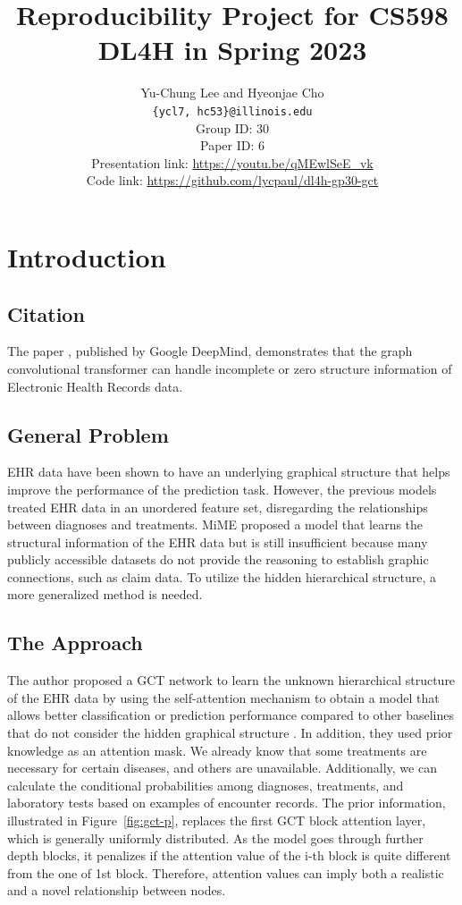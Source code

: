\documentclass[11pt,a4paper]{article}
\title{Reproducibility Project for CS598 DL4H in Spring 2023}
\author{Yu-Chung Lee and Hyeonjae Cho \\
  \texttt{\{ycl7, hc53\}@illinois.edu}
  \\[2em]
  Group ID: 30\\
  Paper ID: 6\\
  Presentation link: \url{https://youtu.be/qMEwlSeE_vk} \\
  Code link: \url{https://github.com/lycpaul/dl4h-gp30-gct}
  }
\begin{document}
\maketitle


\section{Introduction}
\subsection{Citation}
The paper \citep{DBLP:conf/aaai/ChoiXLDFXD20}, published by Google DeepMind, demonstrates that the graph convolutional transformer can handle incomplete or zero structure information of Electronic Health Records data.

\subsection{General Problem}
EHR data have been shown to have an underlying graphical structure that helps improve the performance of the prediction task. However, the previous models treated EHR data in an unordered feature set, disregarding the relationships between diagnoses and treatments. MiME \citep{DBLP:conf/nips/ChoiXSS18} proposed a model that learns the structural information of the EHR data but is still insufficient because many publicly accessible datasets do not provide the reasoning to establish graphic connections, such as claim data. To utilize the hidden hierarchical structure, a more generalized method is needed.

\subsection{The Approach}
The author proposed a GCT network to learn the unknown hierarchical structure of the EHR data by using the self-attention mechanism to obtain a model that allows better classification or prediction performance compared to other baselines that do not consider the hidden graphical structure \citep{DBLP:conf/nips/VaswaniSPUJGKP17}. In addition, they used prior knowledge as an attention mask. We already know that some treatments are necessary for certain diseases, and others are unavailable. Additionally, we can calculate the conditional probabilities among diagnoses, treatments, and laboratory tests based on examples of encounter records. The prior information, illustrated in Figure~\ref{fig:gct-p}, replaces the first GCT block attention layer, which is generally uniformly distributed. As the model goes through further depth blocks, it penalizes if the attention value of the i-th block is quite different from the one of 1st block. Therefore, attention values can imply both a realistic and a novel relationship between nodes.
\end{document}
